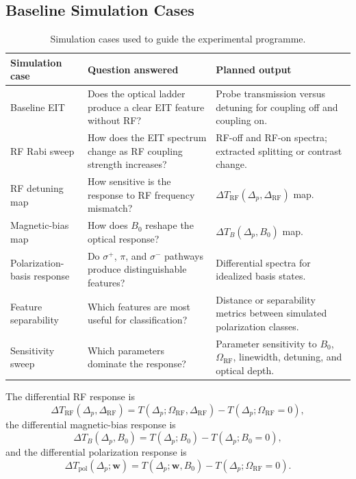 \documentclass{ieeeaccess}
\begin{document}
\subsection{Baseline Simulation Cases}
\label{annex:simulation_cases}

\begin{table}[!t]
\caption{Simulation cases used to guide the experimental programme.}
\label{tab:annex_simulation_cases}
\centering
\renewcommand{\arraystretch}{1.12}
\scriptsize
\begin{tabular}{p{} p{} p{}}
\hline
\textbf{Simulation case} & \textbf{Question answered} & \textbf{Planned output} \\
\hline
Baseline EIT &
Does the optical ladder produce a clear EIT feature without RF? &
Probe transmission versus detuning for coupling off and coupling on. \\

RF Rabi sweep &
How does the EIT spectrum change as RF coupling strength increases? &
RF-off and RF-on spectra; extracted splitting or contrast change. \\

RF detuning map &
How sensitive is the response to RF frequency mismatch? &
\(\Delta T_{\mathrm{RF}}(\Delta_p,\Delta_{\mathrm{RF}})\) map. \\

Magnetic-bias map &
How does \(B_0\) reshape the optical response? &
\(\Delta T_{B}(\Delta_p,B_0)\) map. \\

Polarization-basis response &
Do \(\sigma^+\), \(\pi\), and \(\sigma^-\) pathways produce distinguishable features? &
Differential spectra for idealized basis states. \\

Feature separability &
Which features are most useful for classification? &
Distance or separability metrics between simulated polarization classes. \\

Sensitivity sweep &
Which parameters dominate the response? &
Parameter sensitivity to \(B_0\), \(\Omega_{\mathrm{RF}}\), linewidth, detuning, and optical depth. \\
\hline
\end{tabular}
\end{table}

The differential RF response is
\begin{equation}
\Delta T_{\mathrm{RF}}
(\Delta_p,\Delta_{\mathrm{RF}})
=
T(\Delta_p;\Omega_{\mathrm{RF}},\Delta_{\mathrm{RF}})
-
T(\Delta_p;\Omega_{\mathrm{RF}}=0),
\label{eq:annex_deltaT_rf}
\end{equation}
the differential magnetic-bias response is
\begin{equation}
\Delta T_{B}
(\Delta_p,B_0)
=
T(\Delta_p;B_0)
-
T(\Delta_p;B_0=0),
\label{eq:annex_deltaT_B}
\end{equation}
and the differential polarization response is
\begin{equation}
\Delta T_{\mathrm{pol}}
(\Delta_p;\mathbf{w})
=
T(\Delta_p;\mathbf{w},B_0)
-
T(\Delta_p;\Omega_{\mathrm{RF}}=0).
\label{eq:annex_deltaT_pol}
\end{equation}
\end{document}
